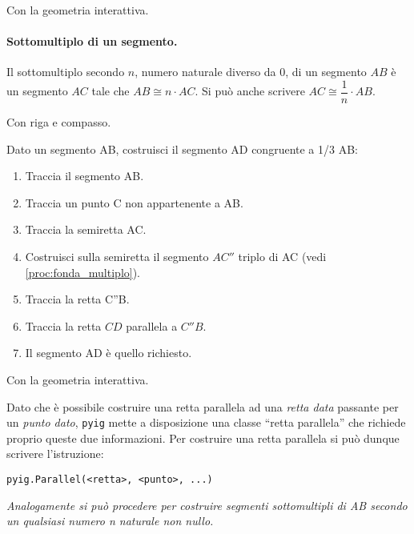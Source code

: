 \ifcoding
Con la geometria interattiva.


\fi

\paragraph{Sottomultiplo di un segmento.} Il sottomultiplo secondo 
\(n\), numero naturale diverso da 0, di un segmento \(AB\) è un segmento 
\(AC\) tale che \(AB\cong n\cdot AC\). Si può anche scrivere \(AC \cong 
\dfrac{1}{n}\cdot AB\).

Con riga e compasso.

\begin{procedura}\label{proc:fonda_sottomultiplo}
  Dato un segmento AB, costruisci il segmento AD congruente a 1/3 AB:
  \begin{enumerate} [nosep]
    \item 
    Traccia il segmento AB.    
    \item 
    Traccia un punto C non appartenente a AB.   
    \item 
    Traccia la semiretta AC.    
    \item 
    Costruisci sulla semiretta il segmento \(AC''\) triplo di AC
    (vedi \ref{proc:fonda_multiplo}).
    \item 
    Traccia la retta C''B. 
    \item 
    Traccia la retta \(CD\) parallela a \(C''B\).      
    \item 
    Il segmento AD è quello richiesto.    
  \end{enumerate}
\end{procedura}

\ifcoding
Con la geometria interattiva.

\begin{osservazione}
Dato che è possibile costruire una retta parallela ad una \emph{retta data} 
passante per un \emph{punto dato}, \lstinline{pyig} mette a disposizione 
una 
classe ``retta parallela'' che richiede proprio queste due informazioni.
Per costruire una retta parallela si può dunque scrivere l'istruzione:

\lstinline{pyig.Parallel(<retta>, <punto>, ...)}
\end{osservazione}


\fi

\textit{Analogamente si può procedere per costruire segmenti sottomultipli 
di 
AB secondo un qualsiasi numero n naturale non nullo.}

